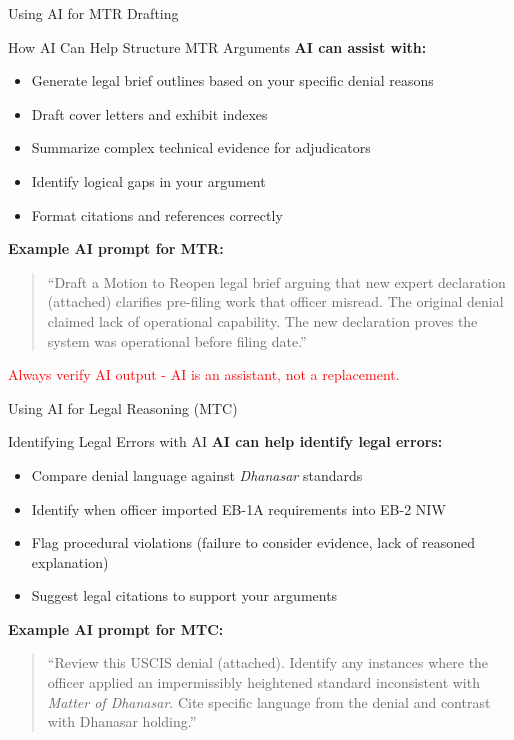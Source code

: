 \documentclass[11pt]{beamer}
\begin{document}
	
	\begin{frame}{Using AI for MTR Drafting}
		\scriptsize
		\begin{block}{How AI Can Help Structure MTR Arguments}
			\textbf{AI can assist with:}
			\begin{itemize}
				\item Generate legal brief outlines based on your specific denial reasons
				\item Draft cover letters and exhibit indexes
				\item Summarize complex technical evidence for adjudicators
				\item Identify logical gaps in your argument
				\item Format citations and references correctly
			\end{itemize}
			\textbf{Example AI prompt for MTR:}
			\begin{quote}
				``Draft a Motion to Reopen legal brief arguing that new expert declaration (attached) clarifies pre-filing work that officer misread. The original denial claimed lack of operational capability. The new declaration proves the system was operational before filing date.''
			\end{quote}
			\textcolor{red}{Always verify AI output - AI is an assistant, not a replacement.}
		\end{block}
	\end{frame}
	
	\begin{frame}{Using AI for Legal Reasoning (MTC)}
		\scriptsize
		\begin{block}{Identifying Legal Errors with AI}
			\textbf{AI can help identify legal errors:}
			\begin{itemize}
				\item Compare denial language against \textit{Dhanasar} standards
				\item Identify when officer imported EB-1A requirements into EB-2 NIW
				\item Flag procedural violations (failure to consider evidence, lack of reasoned explanation)
				\item Suggest legal citations to support your arguments
			\end{itemize}
			\textbf{Example AI prompt for MTC:}
			\begin{quote}
				``Review this USCIS denial (attached). Identify any instances where the officer applied an impermissibly heightened standard inconsistent with \textit{Matter of Dhanasar}. Cite specific language from the denial and contrast with Dhanasar holding.''
			\end{quote}
		\end{block}
	\end{frame}
	
\end{document}
